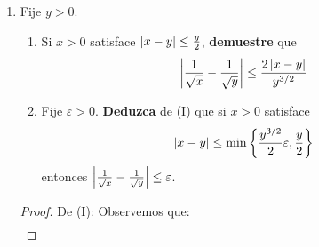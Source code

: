 \documentclass[12pt]{article}
\begin{document}
\begin{enumerate}
\begin{proof}
\begin{equation*}
\begin{split}
            \end{split}
        \end{equation*}
        Pues $\abs{\abs{x}-\abs{y}}\leq\abs{x-y}$. Por tanto:
        \begin{equation*}
            \abs{\frac{1}{x}-\frac{1}{y}}\leq\frac{2}{y^2}\abs{x-y}
        \end{equation*}
        De (II): Como $\abs{x-y}\leq\min\left\{\frac{y^2}{2}\varepsilon,\frac{\abs{y}}{2}\right\}$, en particular $\abs{x-y}\leq\frac{\abs{y}}{2}$. Por tanto, de la parte (I) tenemos que:
        \begin{equation*}
            \abs{\frac{1}{x}-\frac{1}{y}}\leq\frac{2}{y^2}\abs{x-y}
        \end{equation*}
        Pero también $\abs{x-y}\leq\frac{y^2}{2}\varepsilon$. Por tanto:
        \begin{equation*}
            \begin{split}
                \abs{\frac{1}{x}-\frac{1}{y}}\leq&\frac{2}{y^2}\cdot\frac{y^2}{2}\varepsilon\\
                =&\varepsilon\\
                \Rightarrow\abs{\frac{1}{x}-\frac{1}{y}}\leq&\varepsilon
            \end{split}
        \end{equation*}
        \qed
    \end{proof}
    \item Fije $y>0$.
    \begin{enumerate}
        \item Si $x>0$ satisface $\left| x-y \right|\leq\frac{y}{2}$, \textbf{demuestre} que
        \begin{equation*}
            \left| \frac{1}{\sqrt{x}}-\frac{1}{\sqrt{y}} \right|\leq\frac{2\left| x-y \right|}{y^{3/2}}
        \end{equation*}
        \item Fije $\varepsilon>0$. \textbf{Deduzca} de (I) que si $x>0$ satisface
        \begin{equation*}
            \left| x-y \right|\leq\min\left\{\frac{y^{3/2}}{2}\varepsilon,\frac{y}{2}\right\}
        \end{equation*}
        entonces $\left| \frac{1}{\sqrt{x}}-\frac{1}{\sqrt{y}} \right|\leq\varepsilon$.
    \end{enumerate}
    \begin{proof}
        De (I): Observemos que:
        \begin{equation*}
            \begin{split}

\end{split}
\end{equation*}
\end{proof}
\end{enumerate}
\end{document}
